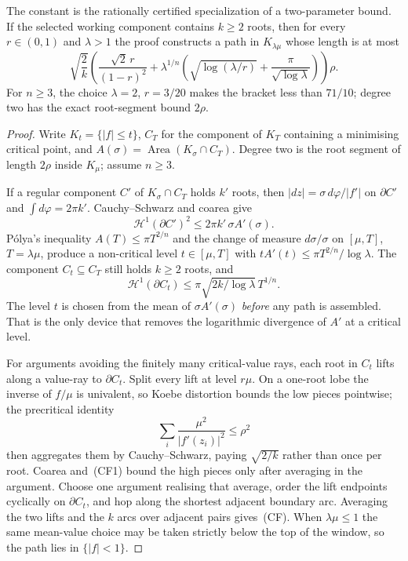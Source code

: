 \documentclass[11pt]{article}
\begin{document}
The constant is the rationally certified specialization of a two-parameter
bound.  If the selected working component contains $k\ge2$ roots, then for
every $r\in(0,1)$ and $\lambda>1$ the proof constructs a path in
$K_{\lambda\mu}$ whose length is at most
\[
 \sqrt{\frac2k}\left(
   \frac{\sqrt2\,r}{(1-r)^2}
   +\lambda^{1/n}\left(
      \sqrt{\log(\lambda/r)}+
      \frac{\pi}{\sqrt{\log\lambda}}
    \right)
 \right)\rho.                                      \tag{CF}
\]
For $n\ge3$, the choice $\lambda=2$, $r=3/20$ makes the bracket less
than $71/10$; degree two has the exact root-segment bound $2\rho$.

\begin{proof}
Write $K_t=\{|f|\le t\}$, $C_T$ for the component of $K_T$ containing a
minimising critical point, and $A(\sigma)=\operatorname{Area}(K_\sigma\cap C_T)$.
Degree two is the root segment of length $2\rho$ inside $K_\mu$; assume
$n\ge3$.

If a regular component $C'$ of $K_\sigma\cap C_T$ holds $k'$ roots, then
$|dz|=\sigma\,d\varphi/|f'|$ on $\partial C'$ and $\int d\varphi=2\pi k'$.
Cauchy--Schwarz and coarea give
\[
 \mathcal H^1(\partial C')^2
 \le2\pi k'\,\sigma A'(\sigma).                     \tag{CF1}
\]
P\'olya's inequality $A(T)\le\pi T^{2/n}$ and the change of measure
$d\sigma/\sigma$ on $[\mu,T]$, $T=\lambda\mu$, produce a non-critical level
$t\in[\mu,T]$ with $t A'(t)\le\pi T^{2/n}/\log\lambda$.  The component
$C_t\subseteq C_T$ still holds $k\ge2$ roots, and
\[
 \mathcal H^1(\partial C_t)
 \le\pi\sqrt{2k/\log\lambda}\,T^{1/n}.
\]
The level $t$ is chosen from the mean of $\sigma A'(\sigma)$ \emph{before}
any path is assembled.  That is the only device that removes the logarithmic
divergence of $A'$ at a critical level.

For arguments avoiding the finitely many critical-value rays, each root in
$C_t$ lifts along a value-ray to $\partial C_t$.  Split every lift at level
$r\mu$.  On a one-root lobe the inverse of $f/\mu$ is univalent, so Koebe
distortion bounds the low pieces pointwise; the precritical identity
\[
 \sum_i\frac{\mu^2}{|f'(z_i)|^2}\le\rho^2          \tag{CF2}
\]
then aggregates them by Cauchy--Schwarz, paying $\sqrt{2/k}$ rather than
once per root.  Coarea and~(CF1) bound the high pieces only after averaging
in the argument.  Choose one argument realising that average, order the lift
endpoints cyclically on $\partial C_t$, and hop along the shortest adjacent
boundary arc.  Averaging the two lifts and the $k$ arcs over adjacent pairs
gives~(CF).  When $\lambda\mu\le1$ the same mean-value choice may be taken
strictly below the top of the window, so the path lies in $\{|f|<1\}$.
\end{proof}
\end{document}
